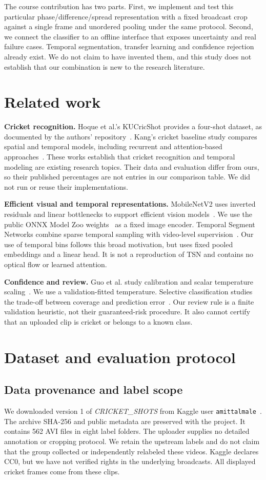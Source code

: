 The course contribution has two parts. First, we implement and test this particular phase/difference/spread representation with a fixed broadcast crop against a single frame and unordered pooling under the same protocol. Second, we connect the classifier to an offline interface that exposes uncertainty and real failure cases. Temporal segmentation, transfer learning and confidence rejection already exist. We do not claim to have invented them, and this study does not establish that our combination is new to the research literature.

\section{Related work}
\textbf{Cricket recognition.} Hoque et al.'s KUCricShot provides a four-shot dataset, as documented by the authors' repository~\cite{kucricshot}. Kang's cricket baseline study compares spatial and temporal models, including recurrent and attention-based approaches~\cite{kang}. These works establish that cricket recognition and temporal modeling are existing research topics. Their data and evaluation differ from ours, so their published percentages are not entries in our comparison table. We did not run or reuse their implementations.

\textbf{Efficient visual and temporal representations.} MobileNetV2 uses inverted residuals and linear bottlenecks to support efficient vision models~\cite{sandler}. We use the public ONNX Model Zoo weights~\cite{onnxmodel} as a fixed image encoder. Temporal Segment Networks combine sparse temporal sampling with video-level supervision~\cite{wang}. Our use of temporal bins follows this broad motivation, but uses fixed pooled embeddings and a linear head. It is not a reproduction of TSN and contains no optical flow or learned attention.

\textbf{Confidence and review.} Guo et al. study calibration and scalar temperature scaling~\cite{guo}. We use a validation-fitted temperature. Selective classification studies the trade-off between coverage and prediction error~\cite{geifman}. Our review rule is a finite validation heuristic, not their guaranteed-risk procedure. It also cannot certify that an uploaded clip is cricket or belongs to a known class.

\section{Dataset and evaluation protocol}
\subsection{Data provenance and label scope}
We downloaded version 1 of \emph{CRICKET\_SHOTS} from Kaggle user \texttt{amittalmale}~\cite{dataset}. The archive SHA-256 and public metadata are preserved with the project. It contains 562 AVI files in eight label folders. The uploader supplies no detailed annotation or cropping protocol. We retain the upstream labels and do not claim that the group collected or independently relabeled these videos. Kaggle declares CC0, but we have not verified rights in the underlying broadcasts. All displayed cricket frames come from these clips.

